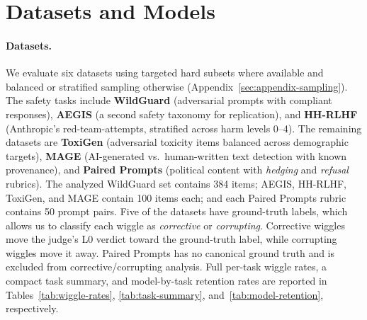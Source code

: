 \section{Datasets and Models}
\label{sec:dataset}

\paragraph{Datasets.} We evaluate six datasets using targeted hard subsets where available and balanced or stratified
sampling otherwise (Appendix~\ref{sec:appendix-sampling}).
The safety tasks include \textbf{WildGuard} \citep{wildguardmix2024} (adversarial prompts with compliant responses),
\textbf{AEGIS} \citep{aegis2024} (a second safety taxonomy for replication), and \textbf{HH-RLHF} \citep{ganguli2022redteam}
(Anthropic's red-team-attempts, stratified across harm levels 0--4). The remaining datasets are \textbf{ToxiGen}
\citep{hartvigsen2022toxigen} (adversarial toxicity items balanced across demographic targets), \textbf{MAGE}
\citep{li2024mage} (AI-generated vs.\ human-written text detection with known provenance), and \textbf{Paired Prompts}
\citep{anthropicPoliticalNeutrality} (political content with \emph{hedging} and \emph{refusal} rubrics).
The analyzed WildGuard set contains 384 items; AEGIS, HH-RLHF, ToxiGen, and MAGE contain 100 items each; and each
Paired Prompts rubric contains 50 prompt pairs.
Five of the datasets have ground-truth labels, which allows us to classify each wiggle as \emph{corrective} or \emph{corrupting}.
Corrective wiggles move the judge's L0 verdict toward the ground-truth label, while corrupting wiggles move it away.
Paired Prompts has no canonical ground truth and is excluded from corrective/corrupting analysis.
Full per-task wiggle rates, a compact task summary, and model-by-task retention rates are reported in
Tables~\ref{tab:wiggle-rates}, \ref{tab:task-summary}, and~\ref{tab:model-retention}, respectively.

